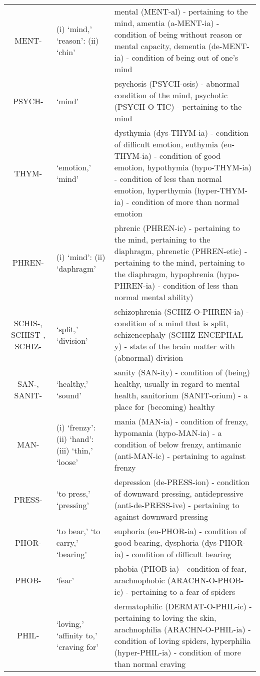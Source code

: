 \begin{longtable}{c | p{} | p{}}
        MENT- & (i) `mind,' `reason': (ii) `chin' & mental (MENT-al) - pertaining to the mind, amentia (a-MENT-ia) - condition of being without reason or mental capacity, dementia (de-MENT-ia) - condition of being out of one's mind \\
        PSYCH- & `mind' & psychosis (PSYCH-osis) - abnormal condition of the mind,  psychotic (PSYCH-O-TIC) - pertaining to the mind \\
        THYM- & `emotion,' `mind' & dysthymia (dys-THYM-ia) - condition of difficult emotion, euthymia (eu-THYM-ia) - condition of good emotion, hypothymia (hypo-THYM-ia) - condition of less than normal emotion, hyperthymia (hyper-THYM-ia) - condition of more than normal emotion \\
        PHREN- & (i) `mind': (ii) `daphragm' & phrenic (PHREN-ic) - pertaining to the mind, pertaining to the diaphragm, phrenetic (PHREN-etic) - pertaining to the mind, pertaining to the diaphragm, hypophrenia (hypo-PHREN-ia) - condition of less than normal mental ability) \\
        SCHIS-, SCHIST-, SCHIZ- & `split,' `division' & schizophrenia (SCHIZ-O-PHREN-ia) - condition of a mind that is split, schizencephaly (SCHIZ-ENCEPHAL-y) - state of the brain matter with (abnormal) division \\
        SAN-, SANIT- & `healthy,' `sound' & sanity (SAN-ity) - condition of (being) healthy, usually in regard to mental health, sanitorium (SANIT-orium) - a place for (becoming) healthy \\
        MAN- & (i) `frenzy': (ii) `hand': (iii) `thin,' `loose' & mania (MAN-ia) - condition of frenzy, hypomania (hypo-MAN-ia) - a condition of below frenzy, antimanic (anti-MAN-ic) - pertaining to against frenzy \\
        PRESS- & `to press,' `pressing' & depression (de-PRESS-ion) - condition of downward pressing, antidepressive (anti-de-PRESS-ive) - pertaining to against downward pressing \\
        PHOR- & `to bear,' `to carry,' `bearing' & euphoria (eu-PHOR-ia) - condition of good bearing, dysphoria (dys-PHOR-ia) - condition of difficult bearing \\
        PHOB- & `fear' & phobia (PHOB-ia) - condition of fear, arachnophobic (ARACHN-O-PHOB-ic) - pertaining to a fear of spiders \\
        PHIL- & `loving,' `affinity to,' `craving for' & dermatophilic (DERMAT-O-PHIL-ic) - pertaining to loving the skin, arachnophilia (ARACHN-O-PHIL-ia) - condition of loving spiders, hyperphilia (hyper-PHIL-ia) - condition of more than normal craving \\

\end{longtable}
